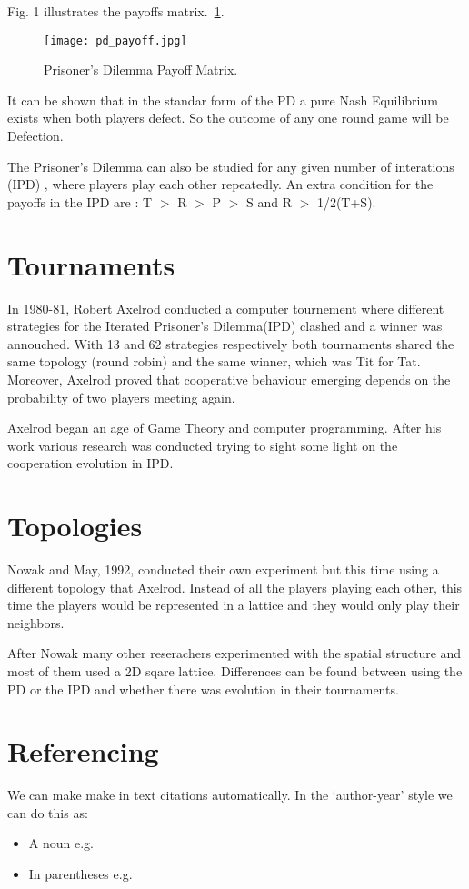 Fig. 1 illustrates the payoffs matrix.~\ref{fig:pd_payoff}.

\begin{figure}[h!]
\centering
\texttt{[image: pd\_payoff.jpg]}
\caption{Prisoner's Dilemma Payoff Matrix.\parencite{Li2011}}
\label{fig:pd_payoff}
\end{figure}

It can be shown that in the standar form of the PD a pure Nash Equilibrium exists
when both players defect. So the outcome of any one round game will be Defection.

The Prisoner’s Dilemma can also be studied for any given number of interations (IPD)
, where players play each other repeatedly. An extra condition for the payoffs
in the IPD are : T \(>\) R \(>\) P \(>\) S and R \(>\) 1/2(T+S).

\section{Tournaments}

In 1980-81, Robert Axelrod conducted a computer tournement where different
strategies for the Iterated Prisoner's Dilemma(IPD) clashed and a winner was annouched.
With 13 and 62 strategies respectively both tournaments shared the same topology
(round robin) and the same winner, which was Tit for Tat.
Moreover, Axelrod proved that cooperative behaviour emerging
depends on the probability of two players meeting  again.


Axelrod began an age of Game Theory and computer programming.
After his work various research was conducted trying to sight some light on the
cooperation evolution in IPD.

\section{Topologies}

Nowak and May, 1992, conducted their own experiment but this
time using a different topology that Axelrod. Instead of all the players playing
each other, this time the players would be represented in a lattice and they would
only play their neighbors.

After Nowak many other reserachers experimented with the spatial structure and
most of them used a 2D sqare lattice. Differences can be found between using
the PD or the IPD and whether there was evolution in their tournaments.

\section{Referencing}
We can make make in text citations automatically.
In the `author-year' style we can do this as:
\begin{itemize}
    \item A noun e.g. \textcite{Gillard2014}
    \item In parentheses e.g. \parencite{Gillard2014}
\end{itemize}

